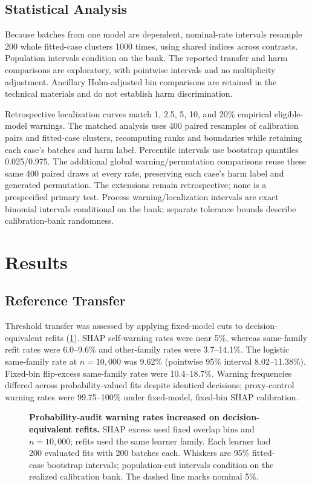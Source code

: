 \documentclass[conference]{IEEEtran}
\begin{document}
\subsection{Statistical Analysis}
Because batches from one model are dependent, nominal-rate intervals resample 200 whole fitted-case clusters 1000 times, using shared indices across contrasts. Population intervals condition on the bank. The reported transfer and harm comparisons are exploratory, with pointwise intervals and no multiplicity adjustment. Ancillary Holm-adjusted bin comparisons are retained in the technical materials and do not establish harm discrimination.

Retrospective localization curves match 1, 2.5, 5, 10, and 20\% empirical eligible-model warnings. The matched analysis uses 400 paired resamples of calibration pairs and fitted-case clusters, recomputing ranks and boundaries while retaining each case's batches and harm label. Percentile intervals use bootstrap quantiles 0.025/0.975. The additional global warning/permutation comparisons reuse these same 400 paired draws at every rate, preserving each case's harm label and generated permutation. The extensions remain retrospective; none is a prespecified primary test. Process warning/localization intervals are exact binomial intervals conditional on the bank; separate tolerance bounds describe calibration-bank randomness.

\section{Results}
\label{sec:results}
\subsection{Reference Transfer}
Threshold transfer was assessed by applying fixed-model cuts to decision-equivalent refits (\cref{fig:reference-transfer}). SHAP self-warning rates were near 5\%, whereas same-family refit rates were 6.0--9.6\% and other-family rates were 3.7--14.1\%. The logistic same-family rate at $n=10{,}000$ was 9.62\% (pointwise 95\% interval 8.02--11.38\%). Fixed-bin flip-excess same-family rates were 10.4--18.7\%. Warning frequencies differed across probability-valued fits despite identical decisions; proxy-control warning rates were 99.75--100\% under fixed-model, fixed-bin SHAP calibration.

\begin{figure}[!t]
\centering

\caption{\textbf{Probability-audit warning rates increased on decision-equivalent refits.} SHAP excess used fixed overlap bins and $n=10{,}000$; refits used the same learner family. Each learner had 200 evaluated fits with 200 batches each. Whiskers are 95\% fitted-case bootstrap intervals; population-cut intervals condition on the realized calibration bank. The dashed line marks nominal 5\%.}
\label{fig:reference-transfer}
\end{figure}
\end{document}
